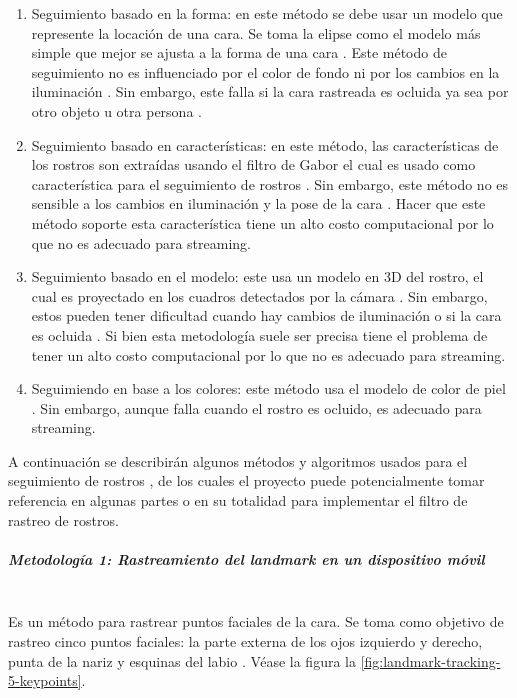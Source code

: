 \documentclass[a4paper,openright,12pt]{report}
\begin{document}
\begin{enumerate}
    \item Seguimiento basado en la forma: en este método se debe usar un modelo
    que represente la locación de una cara. Se toma la elipse como el modelo más
    simple que mejor se ajusta a la forma de una cara \cite{eleftheriadis1995automatic}. Este método de
    seguimiento no es influenciado por el color de fondo ni por los cambios en
    la iluminación \cite{shaik2007robust}. Sin embargo, este falla si la cara rastreada es ocluida ya
    sea por otro objeto u otra persona \cite{shaik2007robust}.
    \item Seguimiento basado en características:  en este método, las
    características de los rostros son extraídas usando el filtro de Gabor el
    cual es usado como característica para el seguimiento de rostros \cite{shaik2007robust}. Sin
    embargo, este método no es sensible a los cambios en iluminación y la pose
    de la cara \cite{shaik2007robust}. Hacer que este método soporte esta característica tiene un alto
    costo computacional por lo que no es adecuado para streaming.
    \item Seguimiento basado en el modelo: este usa un modelo en 3D del rostro,
    el cual es proyectado en los cuadros detectados por la cámara \cite{shaik2007robust}. Sin embargo,
    estos pueden tener dificultad cuando hay cambios de iluminación o si la cara
    es ocluida \cite{smolyanskiy2014real}. Si bien esta metodología suele ser precisa tiene el problema de
    tener un alto costo computacional por lo que no es adecuado para streaming.
    \item Seguimiendo en base a los colores: este método usa el modelo de color
    de piel \cite{shaik2007robust}. Sin embargo, aunque falla cuando el rostro es ocluido, es adecuado
    para streaming.
\end{enumerate}

A continuación se describirán algunos métodos y algoritmos usados para el
seguimiento de rostros , de los cuales el proyecto puede potencialmente tomar
referencia en algunas partes o en su totalidad para implementar el filtro de
rastreo de rostros.

\subparagraph{Metodología 1: Rastreamiento del landmark en un dispositivo móvil} \label{para:landmarkMovil}
\mbox{} \\
Es un método para rastrear puntos faciales de la cara. Se toma como
objetivo de rastreo cinco puntos faciales: la parte externa de los ojos
izquierdo y derecho, punta de la nariz y esquinas del labio
\cite{wettum2017facial}. Véase la figura
la \ref{fig:landmark-tracking-5-keypoints}.\\
\end{document}
